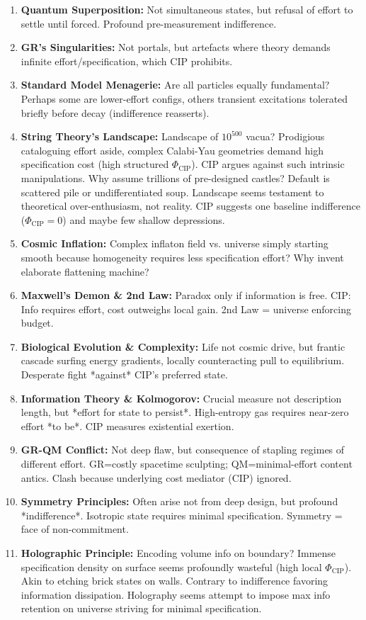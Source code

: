 \documentclass[11pt, a4paper]{article}
\newcommand{\subt}[1]{\mathrm{#1}}
\begin{document}
\begin{enumerate}
    \item \textbf{Quantum Superposition:} Not simultaneous states, but refusal of effort to settle until forced. Profound pre-measurement indifference.
    \item \textbf{GR's Singularities:} Not portals, but artefacts where theory demands infinite effort/specification, which CIP prohibits.
    \item \textbf{Standard Model Menagerie:} Are all particles equally fundamental? Perhaps some are lower-effort configs, others transient excitations tolerated briefly before decay (indifference reasserts).
    \item \textbf{String Theory's Landscape:} Landscape of $10^{500}$ vacua? Prodigious cataloguing effort aside, complex Calabi-Yau geometries demand high specification cost (high structured $\Phi_{\subt{CIP}}$). CIP argues against such intrinsic manipulations. Why assume trillions of pre-designed castles? Default is scattered pile or undifferentiated soup. Landscape seems testament to theoretical over-enthusiasm, not reality. CIP suggests one baseline indifference ($\Phi_{\subt{CIP}}=0$) and maybe few shallow depressions.
    \item \textbf{Cosmic Inflation:} Complex inflaton field vs. universe simply starting smooth because homogeneity requires less specification effort? Why invent elaborate flattening machine?
    \item \textbf{Maxwell's Demon \& 2nd Law:} Paradox only if information is free. CIP: Info requires effort, cost outweighs local gain. 2nd Law = universe enforcing budget.
    \item \textbf{Biological Evolution \& Complexity:} Life not cosmic drive, but frantic cascade surfing energy gradients, locally counteracting pull to equilibrium. Desperate fight *against* CIP's preferred state.
    \item \textbf{Information Theory \& Kolmogorov:} Crucial measure not description length, but *effort for state to persist*. High-entropy gas requires near-zero effort *to be*. CIP measures existential exertion.
    \item \textbf{GR-QM Conflict:} Not deep flaw, but consequence of stapling regimes of different effort. GR=costly spacetime sculpting; QM=minimal-effort content antics. Clash because underlying cost mediator (CIP) ignored.
    \item \textbf{Symmetry Principles:} Often arise not from deep design, but profound *indifference*. Isotropic state requires minimal specification. Symmetry = face of non-commitment.
    \item \textbf{Holographic Principle:} Encoding volume info on boundary? Immense specification density on surface seems profoundly wasteful (high local $\Phi_{\subt{CIP}}$). Akin to etching brick states on walls. Contrary to indifference favoring information dissipation. Holography seems attempt to impose max info retention on universe striving for minimal specification.
\end{enumerate}
\end{document}
